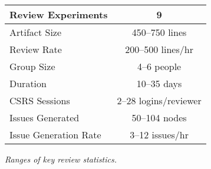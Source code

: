 \begin{figure}[h]
  \begin{center}
  \begin{tabular} {|l|c|} \hline   
    Review Experiments & 9 \\ \hline
    Artifact Size & 450--750 lines \\ \hline
    Review Rate & 200--500 lines/hr \\ \hline
    Group Size &  4--6 people\\ \hline
    Duration & 10--35 days \\ \hline
    CSRS Sessions & 2--28 logins/reviewer \\ \hline
    Issues Generated & 50--104 nodes\\ \hline
    Issue Generation Rate & 3--12 issues/hr \\ \hline 
  \end{tabular}
  \caption{{\em Ranges of key review statistics.}}
  \label{fig:statistics}
  \end{center}
\end{figure}







  






